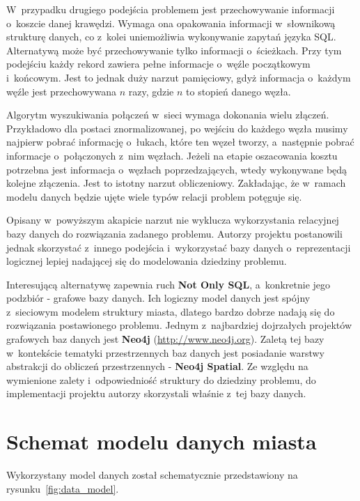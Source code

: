 \documentclass[a4paper,12pt]{article}
\begin{document}
	W~przypadku drugiego podejścia problemem jest przechowywanie informacji o~koszcie danej krawędzi. Wymaga ona opakowania informacji w~słownikową strukturę danych, co z~kolei uniemożliwia wykonywanie zapytań języka SQL. Alternatywą może być przechowywanie tylko informacji o~ścieżkach. Przy tym podejściu każdy rekord zawiera pełne informacje o~węźle początkowym i~końcowym. Jest to jednak duży narzut pamięciowy, gdyż informacja o~każdym węźle jest przechowywana $n$ razy, gdzie $n$ to stopień danego węzła.

	Algorytm wyszukiwania połączeń w~sieci wymaga dokonania wielu złączeń. Przykładowo dla postaci znormalizowanej, po wejściu do każdego węzła musimy najpierw pobrać informację o~łukach, które ten węzeł tworzy, a~następnie pobrać informacje o~połączonych z~nim węzłach. Jeżeli na etapie oszacowania kosztu potrzebna jest informacja o~węzłach poprzedzających, wtedy wykonywane będą kolejne złączenia. Jest to istotny narzut obliczeniowy. Zakładając, że w~ramach modelu danych będzie ujęte wiele typów relacji problem potęguje się.

	Opisany w~powyższym akapicie narzut nie wyklucza wykorzystania relacyjnej bazy danych do rozwiązania zadanego problemu. Autorzy projektu postanowili jednak skorzystać z~innego podejścia i~wykorzystać bazy danych o~reprezentacji logicznej lepiej nadającej się do modelowania dziedziny problemu.

	Interesującą alternatywę zapewnia ruch \textbf{Not Only SQL}, a~konkretnie jego podzbiór - grafowe bazy danych. Ich logiczny model danych jest spójny z~sieciowym modelem struktury miasta, dlatego bardzo dobrze nadają się do rozwiązania postawionego problemu. Jednym z~najbardziej dojrzałych projektów grafowych baz danych jest \textbf{Neo4j} (\url{http://www.neo4j.org}). Zaletą tej bazy w~kontekście tematyki przestrzennych baz danych jest posiadanie warstwy abstrakcji do obliczeń przestrzennych - \textbf{Neo4j Spatial}. Ze względu na wymienione zalety i~odpowiedniość struktury do dziedziny problemu, do implementacji projektu autorzy skorzystali właśnie z~tej bazy danych.

	\section*{Schemat modelu danych miasta}

	Wykorzystany model danych został schematycznie przedstawiony na rysunku~\ref{fig:data_model}.
\end{document}
